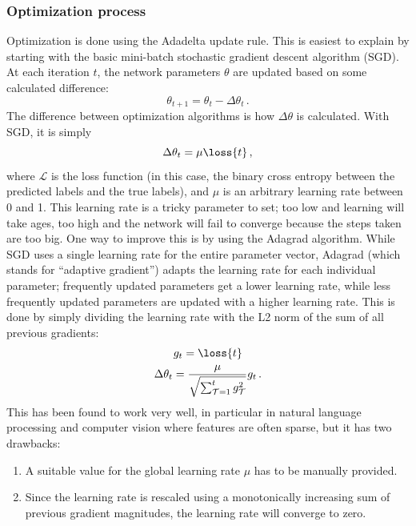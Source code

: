 \subsubsection{Optimization process}\label{sec:optim}
Optimization is done using the Adadelta update rule\citep{adadelta}. This is
easiest to explain by starting with the basic mini-batch stochastic gradient
descent algorithm (SGD). At each iteration $t$, the network parameters $\theta$
are updated based on some calculated difference:
\begin{equation}
  \theta_{t+1} = \theta_{t} - \Delta\theta_t\,.
\end{equation}
The difference between optimization algorithms is how $\Delta\theta$ is
calculated. With SGD, it is simply
\begin{equation}
  \Delta\theta_t = \mu \loss{t}\,,
\end{equation}
where $\mathcal{L}$ is the loss function (in this case, the binary cross entropy
between the predicted labels and the true labels), and $\mu$ is an arbitrary
learning rate between 0 and 1. This learning rate is a tricky parameter to set;
too low and learning will take ages, too high and the network will fail to
converge because the steps taken are too big. One way to improve this is by
using the Adagrad\citep{adagrad} algorithm. While SGD uses a single learning
rate for the entire parameter vector, Adagrad (which stands for ``adaptive
gradient'') adapts the learning rate for each individual parameter; frequently
updated parameters get a lower learning rate, while less frequently updated
parameters are updated with a higher learning rate. This is done by simply
dividing the learning rate with the L2 norm of the sum of all previous gradients:
\begin{gather}
  g_{t} = \loss{t} \\
  \Delta\theta_t = \frac{\mu}{\sqrt{\sum^{t}_{\mathcal{T}=1}g_{\mathcal{T}}^2}} g_{t}\,.
\end{gather}
This has been found to work very well, in particular in natural language
processing and computer vision where features are often sparse, but it has two
drawbacks:
\begin{enumerate}
  \item A suitable value for the global learning rate $\mu$ has to be
    manually provided.
  \item Since the learning rate is rescaled using a monotonically increasing sum of
    previous gradient magnitudes, the learning rate will converge to zero.
\end{enumerate}
